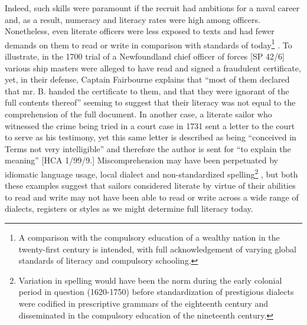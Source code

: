 Indeed, such skills were paramount if the recruit had ambitions for a naval career and, as a result, numeracy and literacy rates were high among officers. Nonetheless, even literate officers were less exposed to texts and had fewer demands on them to read or write in comparison with standards of today\footnote{A comparison with the compulsory education of a wealthy nation in the twenty-first century is intended, with full acknowledgement of varying global standards of literacy and compulsory schooling.} . To illustrate, in the 1700 trial of a Newfoundland chief officer of forces [SP 42/6] various ship masters were alleged to have read and signed a fraudulent certificate, yet, in their defense, Captain Fairbourne explains that “most of them declared that mr. B. handed the certificate to them, and that they were ignorant of the full contents thereof” seeming to suggest that their literacy was not equal to the comprehension of the full document. In another case, a literate sailor who witnessed the crime being tried in a court case in 1731 sent a letter to the court to serve as his testimony, yet this same letter is described as being “conceived in Terms not very intelligible” and therefore the author is sent for “to explain the meaning” [HCA 1/99/9.] Miscomprehension may have been perpetuated by idiomatic language usage, local dialect and non-standardized spelling\footnote{Variation in spelling would have been the norm during the early colonial period in question (1620-1750) before standardization of prestigious dialects were codified in prescriptive grammars of the eighteenth century and disseminated in the compulsory education of the nineteenth century.} , but both these examples suggest that sailors considered literate by virtue of their abilities to read and write may not have been able to read or write across a wide range of dialects, registers or styles as we might determine full literacy today.  

